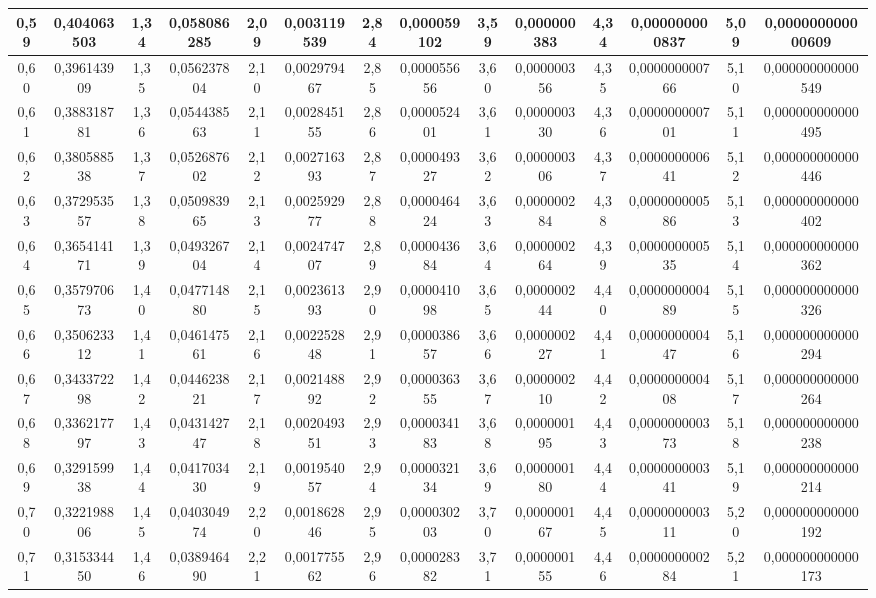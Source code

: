 \documentclass[a4paper,8pt]{article}
\begin{document}
\begin{table}[!ht]
{\begin{tabular}{|c|c||c|c||c|c||c|c||c|c||c|c||c|c||}
        0,59 & 0,404063503 & 1,34 & 0,058086285 & 2,09 & 0,003119539 & 2,84 & 0,000059102 & 3,59 & 0,000000383 & 4,34 & 0,000000000837 & 5,09 & 0,000000000000609 \\ \hline
        0,60 & 0,396143909 & 1,35 & 0,056237804 & 2,10 & 0,002979467 & 2,85 & 0,000055656 & 3,60 & 0,000000356 & 4,35 & 0,000000000766 & 5,10 & 0,000000000000549 \\ \hline
        0,61 & 0,388318781 & 1,36 & 0,054438563 & 2,11 & 0,002845155 & 2,86 & 0,000052401 & 3,61 & 0,000000330 & 4,36 & 0,000000000701 & 5,11 & 0,000000000000495 \\ \hline
        0,62 & 0,380588538 & 1,37 & 0,052687602 & 2,12 & 0,002716393 & 2,87 & 0,000049327 & 3,62 & 0,000000306 & 4,37 & 0,000000000641 & 5,12 & 0,000000000000446 \\ \hline
        0,63 & 0,372953557 & 1,38 & 0,050983965 & 2,13 & 0,002592977 & 2,88 & 0,000046424 & 3,63 & 0,000000284 & 4,38 & 0,000000000586 & 5,13 & 0,000000000000402 \\ \hline
        0,64 & 0,365414171 & 1,39 & 0,049326704 & 2,14 & 0,002474707 & 2,89 & 0,000043684 & 3,64 & 0,000000264 & 4,39 & 0,000000000535 & 5,14 & 0,000000000000362 \\ \hline
        0,65 & 0,357970673 & 1,40 & 0,047714880 & 2,15 & 0,002361393 & 2,90 & 0,000041098 & 3,65 & 0,000000244 & 4,40 & 0,000000000489 & 5,15 & 0,000000000000326 \\ \hline
        0,66 & 0,350623312 & 1,41 & 0,046147561 & 2,16 & 0,002252848 & 2,91 & 0,000038657 & 3,66 & 0,000000227 & 4,41 & 0,000000000447 & 5,16 & 0,000000000000294 \\ \hline
        0,67 & 0,343372298 & 1,42 & 0,044623821 & 2,17 & 0,002148892 & 2,92 & 0,000036355 & 3,67 & 0,000000210 & 4,42 & 0,000000000408 & 5,17 & 0,000000000000264 \\ \hline
        0,68 & 0,336217797 & 1,43 & 0,043142747 & 2,18 & 0,002049351 & 2,93 & 0,000034183 & 3,68 & 0,000000195 & 4,43 & 0,000000000373 & 5,18 & 0,000000000000238 \\ \hline
        0,69 & 0,329159938 & 1,44 & 0,041703430 & 2,19 & 0,001954057 & 2,94 & 0,000032134 & 3,69 & 0,000000180 & 4,44 & 0,000000000341 & 5,19 & 0,000000000000214 \\ \hline
        0,70 & 0,322198806 & 1,45 & 0,040304974 & 2,20 & 0,001862846 & 2,95 & 0,000030203 & 3,70 & 0,000000167 & 4,45 & 0,000000000311 & 5,20 & 0,000000000000192 \\ \hline
        0,71 & 0,315334450 & 1,46 & 0,038946490 & 2,21 & 0,001775562 & 2,96 & 0,000028382 & 3,71 & 0,000000155 & 4,46 & 0,000000000284 & 5,21 & 0,000000000000173 \\ \hline

\end{tabular}}
\end{table}
\end{document}
